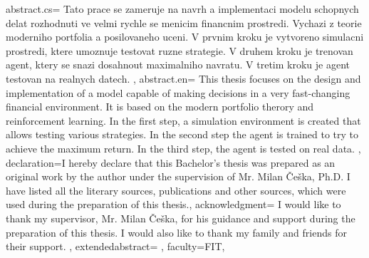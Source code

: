 {%
    abstract.cs={
        Tato prace se zameruje na navrh a implementaci modelu schopnych
        delat rozhodnuti ve velmi rychle se menicim financnim prostredi. Vychazi z teorie
        moderniho portfolia a posilovaneho uceni. V prvnim kroku je vytvoreno
        simulacni prostredi, ktere umoznuje testovat ruzne strategie. V druhem kroku
        je trenovan agent, ktery se snazi dosahnout maximalniho navratu.
        V tretim kroku je agent testovan na realnych datech.
    }, %
    abstract.en={
        This thesis focuses on the design and implementation of a model capable of
        making decisions in a very fast-changing financial environment. It is based on the
        modern portfolio therory and reinforcement learning.
        In the first step, a simulation environment is created
        that allows testing various strategies. In the second step
        the agent is trained to try to achieve the maximum return.
        In the third step, the agent is tested on real data.
    }, %
    declaration={I hereby declare that this Bachelor's thesis was prepared as an original work by the author under
    the supervision of Mr. Milan Češka, Ph.D. %
    I have listed all the literary sources, publications and other sources, which were used during the preparation of this thesis.},
%
    acknowledgment={
        I would like to thank my supervisor, Mr. Milan Češka, for his guidance and support during the preparation of this thesis.
        I would also like to thank my family and friends for their support.
    },
%
    extendedabstract={ %
    },
%
    faculty={FIT}, %
}

